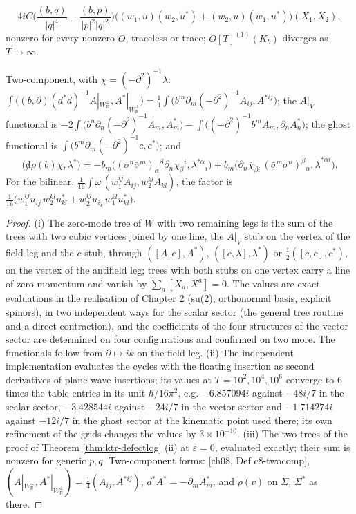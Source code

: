 \begin{proposition}
\begin{itemize}
\[
4iC\Big(\frac{(b,q)}{|q|^4}-\frac{(b,p)}{|p|^2|q|^2}\Big)\big((w_1,u)(w_2,u^*)+(w_2,u)(w_1,u^*)\big)(X_1,X_2),
\]
nonzero for every nonzero $O$, traceless or trace; $O[T]^{(1)}(K_b)$ diverges as $T\to\infty$.
\end{itemize}
Two-component, with $\chi=(-\partial^2)^{-1}\lambda$: $\int\big((b,\partial)(d^*d)^{-1}A|_{W_{\mathbb R}^\perp},A^*|_{W_{\mathbb R}^\perp}\big)=\tfrac14\int\big(b^m\partial_m(-\partial^2)^{-1}A_{ij},A^{*ij}\big)$; the $A|_V$ functional is $-2\int\big(b^n\partial_n(-\partial^2)^{-1}A_m,A^*_m\big)-\int\big((-\partial^2)^{-1}b^mA_m,\partial_nA^*_n\big)$; the ghost functional is $\int\big(b^m\partial_m(-\partial^2)^{-1}c,c^*\big)$; and
\[
\big({\not d}\rho(b)\chi,\lambda^*\big)=-b_m\big((\sigma^n\bar\sigma^m)_\alpha{}^\beta\partial_n\chi_\beta{}^i,\lambda^{*\alpha}{}_i\big)+b_m\big(\partial_n\bar\chi_{\dot\beta i}\,(\bar\sigma^m\sigma^n)^{\dot\beta}{}_{\dot\alpha},\bar\lambda^{*\dot\alpha i}\big).
\]
For the bilinear, $\tfrac1{16}\int\omega\,(w_1^{ij}A_{ij},w_2^{kl}A_{kl})$, the factor is $\tfrac1{16}\big(w_1^{ij}u_{ij}\,w_2^{kl}u^*_{kl}+w_2^{ij}u_{ij}\,w_1^{kl}u^*_{kl}\big)$.
\end{proposition}

\begin{proof}
(i) The zero-mode tree of $W$ with two remaining legs is the sum of the trees with two cubic vertices joined by one line, the $A|_V$ stub on the vertex of the field leg and the $c$ stub, through $([A,c],A^*)$, $([c,\lambda],\lambda^*)$ or $\tfrac12([c,c],c^*)$, on the vertex of the antifield leg; trees with both stubs on one vertex carry a line of zero momentum and vanish by $\sum_a[X_a,X^a]=0$. The values are exact evaluations in the realisation of Chapter 2 (su(2), orthonormal basis, explicit spinors), in two independent ways for the scalar sector (the general tree routine and a direct contraction), and the coefficients of the four structures of the vector sector are determined on four configurations and confirmed on two more. The functionals follow from $\partial\mapsto ik$ on the field leg. (ii) The independent implementation evaluates the cycles with the floating insertion as second derivatives of plane-wave insertions; its values at $T=10^2,10^4,10^6$ converge to $6$ times the table entries in its unit $\hbar/16\pi^2$, e.g. $-6.857094i$ against $-48i/7$ in the scalar sector, $-3.428544i$ against $-24i/7$ in the vector sector and $-1.714274i$ against $-12i/7$ in the ghost sector at the kinematic point used there; its own refinement of the grids changes the values by $3\times10^{-10}$. (iii) The two trees of the proof of Theorem \ref{thm:ktr-defectlog} (ii) at $\varepsilon=0$, evaluated exactly; their sum is nonzero for generic $p,q$. Two-component forms: [ch08, Def c8-twocomp], $(A|_{W_{\mathbb R}^\perp},A^*|_{W_{\mathbb R}^\perp})=\tfrac14(A_{ij},A^{*ij})$, $d^*A^*=-\partial_mA^*_m$, and $\rho(v)$ on $\Sigma$, $\Sigma^*$ as there.
\end{proof}

